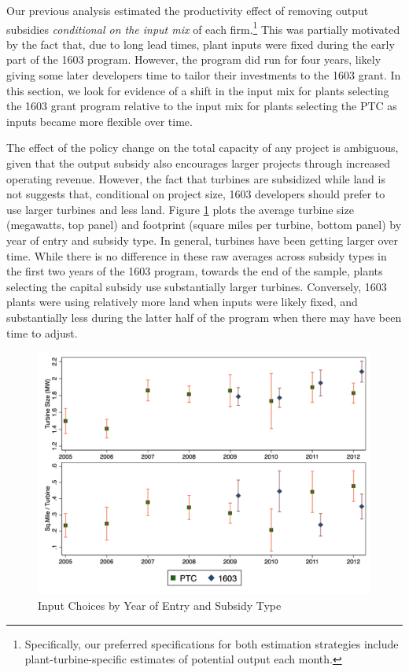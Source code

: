 \documentclass[12pt]{article}
\begin{document}
Our previous analysis estimated the productivity effect of removing output subsidies \textit{conditional on the input mix} of each firm.\footnote{Specifically, our preferred specifications for both estimation strategies include plant-turbine-specific estimates of potential output each month.} This was partially motivated by the fact that, due to long lead times, plant inputs were fixed during the early part of the 1603 program. However, the program did run for four years, likely giving some later developers time to tailor their investments to the 1603 grant. In this section, we look for evidence of a shift in the input mix for plants selecting the 1603 grant program relative to the input mix for plants selecting the PTC as inputs became more flexible over time. 

The effect of the policy change on the total capacity of any project is ambiguous, given that the output subsidy also encourages larger projects through increased operating revenue. However, the fact that turbines are subsidized while land is not suggests that, conditional on project size, 1603 developers should prefer to use larger turbines and less land. Figure \ref{fig:input_trends} plots the average turbine size (megawatts, top panel) and footprint (square miles per turbine, bottom panel) by year of entry and subsidy type. In general, turbines have been getting larger over time. While there is no difference in these raw averages across subsidy types in the first two years of the 1603 program, towards the end of the sample, plants selecting the capital subsidy use substantially larger turbines.  Conversely, 1603 plants were using relatively more land when inputs were likely fixed, and substantially less during the latter half of the program when there may have been time to adjust. 

\begin{figure}[H] \centering
    \caption{Input Choices by Year of Entry and Subsidy Type \label{fig:input_trends}}
    \includegraphics[width=0.85\linewidth]{../output/figures/input_trends.png}
\end{figure}
\end{document}
